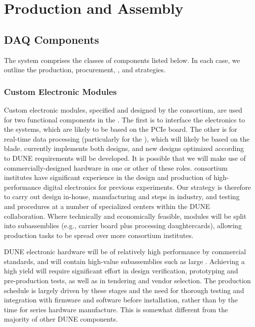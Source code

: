 
\section{Production and Assembly}
\label{sec:fd-daq-prod-assy}

\subsection{DAQ Components}

The   system comprises the classes of components listed below. In each case, we outline the production, procurement, , and  strategies.

\subsubsection{Custom Electronic Modules}

Custom electronic modules, specified and designed by the 
consortium, are used for two functional components in the 
. 
The first is to interface the  electronics to the   systems, which are likely to be based on the 
PCIe board.
The other is for real-time data processing (particularly for the
), which will likely be based on the
  blade.
 currently implements both designs, and new designs optimized according to
DUNE requirements will be developed.
It is possible that we will make use of commercially-designed hardware
in one or other of these roles.  consortium institutes have
significant experience in the design and production of high-performance digital electronics for previous experiments.
Our strategy is therefore to carry out design in-house, manufacturing
and  steps in industry, and testing and  procedures at a number of
specialized centers within the DUNE collaboration. 
Where technically and economically feasible, modules will be split
into subassemblies (e.g., carrier board plus processing
daughtercards), allowing production tasks to be spread over more
consortium institutes.

DUNE electronic hardware will be of relatively high performance by commercial standards, and will contain high-value subassemblies such as large . Achieving a high yield will require significant effort in design verification, prototyping and pre-production tests, as well as in tendering and vendor selection. The production schedule is largely driven by these stages and the need for thorough testing and integration with firmware and software before installation, rather than by the time for series hardware manufacture. This is somewhat different from the majority of other DUNE  components.

